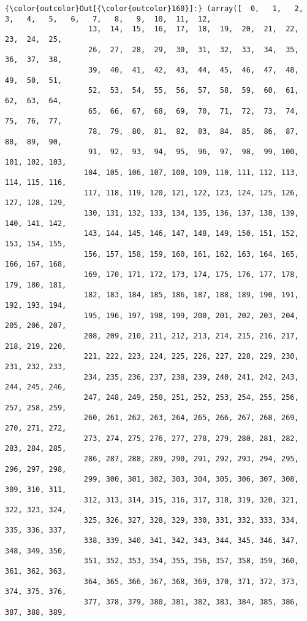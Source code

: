 \documentclass[11pt]{article}
\begin{document}
\begin{Verbatim}[commandchars=\\\{\}]
{\color{outcolor}Out[{\color{outcolor}160}]:} (array([  0,   1,   2,   3,   4,   5,   6,   7,   8,   9,  10,  11,  12,
                   13,  14,  15,  16,  17,  18,  19,  20,  21,  22,  23,  24,  25,
                   26,  27,  28,  29,  30,  31,  32,  33,  34,  35,  36,  37,  38,
                   39,  40,  41,  42,  43,  44,  45,  46,  47,  48,  49,  50,  51,
                   52,  53,  54,  55,  56,  57,  58,  59,  60,  61,  62,  63,  64,
                   65,  66,  67,  68,  69,  70,  71,  72,  73,  74,  75,  76,  77,
                   78,  79,  80,  81,  82,  83,  84,  85,  86,  87,  88,  89,  90,
                   91,  92,  93,  94,  95,  96,  97,  98,  99, 100, 101, 102, 103,
                  104, 105, 106, 107, 108, 109, 110, 111, 112, 113, 114, 115, 116,
                  117, 118, 119, 120, 121, 122, 123, 124, 125, 126, 127, 128, 129,
                  130, 131, 132, 133, 134, 135, 136, 137, 138, 139, 140, 141, 142,
                  143, 144, 145, 146, 147, 148, 149, 150, 151, 152, 153, 154, 155,
                  156, 157, 158, 159, 160, 161, 162, 163, 164, 165, 166, 167, 168,
                  169, 170, 171, 172, 173, 174, 175, 176, 177, 178, 179, 180, 181,
                  182, 183, 184, 185, 186, 187, 188, 189, 190, 191, 192, 193, 194,
                  195, 196, 197, 198, 199, 200, 201, 202, 203, 204, 205, 206, 207,
                  208, 209, 210, 211, 212, 213, 214, 215, 216, 217, 218, 219, 220,
                  221, 222, 223, 224, 225, 226, 227, 228, 229, 230, 231, 232, 233,
                  234, 235, 236, 237, 238, 239, 240, 241, 242, 243, 244, 245, 246,
                  247, 248, 249, 250, 251, 252, 253, 254, 255, 256, 257, 258, 259,
                  260, 261, 262, 263, 264, 265, 266, 267, 268, 269, 270, 271, 272,
                  273, 274, 275, 276, 277, 278, 279, 280, 281, 282, 283, 284, 285,
                  286, 287, 288, 289, 290, 291, 292, 293, 294, 295, 296, 297, 298,
                  299, 300, 301, 302, 303, 304, 305, 306, 307, 308, 309, 310, 311,
                  312, 313, 314, 315, 316, 317, 318, 319, 320, 321, 322, 323, 324,
                  325, 326, 327, 328, 329, 330, 331, 332, 333, 334, 335, 336, 337,
                  338, 339, 340, 341, 342, 343, 344, 345, 346, 347, 348, 349, 350,
                  351, 352, 353, 354, 355, 356, 357, 358, 359, 360, 361, 362, 363,
                  364, 365, 366, 367, 368, 369, 370, 371, 372, 373, 374, 375, 376,
                  377, 378, 379, 380, 381, 382, 383, 384, 385, 386, 387, 388, 389,

\end{Verbatim}
\end{document}

